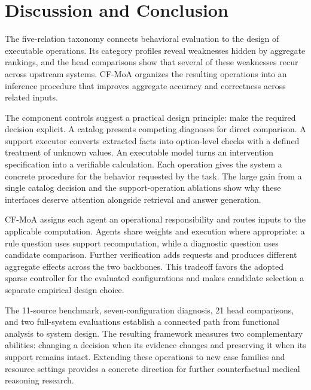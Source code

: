 \section{Discussion and Conclusion}
\label{sec:discussion}

The five-relation taxonomy connects behavioral evaluation to the design of executable operations. Its category profiles reveal weaknesses hidden by aggregate rankings, and the head comparisons show that several of these weaknesses recur across upstream systems. CF-MoA organizes the resulting operations into an inference procedure that improves aggregate accuracy and correctness across related inputs.

The component controls suggest a practical design principle: make the required decision explicit. A catalog presents competing diagnoses for direct comparison. A support executor converts extracted facts into option-level checks with a defined treatment of unknown values. An executable model turns an intervention specification into a verifiable calculation. Each operation gives the system a concrete procedure for the behavior requested by the task. The large gain from a single catalog decision and the support-operation ablations show why these interfaces deserve attention alongside retrieval and answer generation.

CF-MoA assigns each agent an operational responsibility and routes inputs to the applicable computation. Agents share weights and execution where appropriate: a rule question uses support recomputation, while a diagnostic question uses candidate comparison. Further verification adds requests and produces different aggregate effects across the two backbones. This tradeoff favors the adopted sparse controller for the evaluated configurations and makes candidate selection a separate empirical design choice.

The 11-source benchmark, seven-configuration diagnosis, 21 head comparisons, and two full-system evaluations establish a connected path from functional analysis to system design. The resulting framework measures two complementary abilities: changing a decision when its evidence changes and preserving it when its support remains intact. Extending these operations to new case families and resource settings provides a concrete direction for further counterfactual medical reasoning research.
